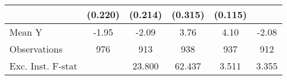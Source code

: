 {\begin{tabular}{l*{5}{c}}
            &     (0.220)         &     (0.214)         &     (0.315)         &     (0.115)         &                     \\
\midrule
Mean Y      &       -1.95         &       -2.09         &        3.76         &        4.10         &       -2.08         \\
Observations&         976         &         913         &         938         &         937         &         912         \\
Exc. Inst. F-stat&                     &      23.800         &      62.437         &       3.511         &       3.355         \\
\bottomrule
\end{tabular}
}
